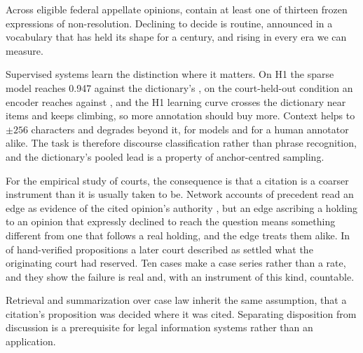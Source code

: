 Across \NEligible{} eligible federal appellate opinions, \Prevalence{} contain at least one
of thirteen frozen expressions of non-resolution. Declining to decide is routine,
announced in a vocabulary that has held its shape for a century, and rising in
every era we can measure.

Supervised systems learn the distinction where it matters. On H1 the sparse model
reaches 0.947 against the dictionary's \LexHOne{}, on the court-held-out condition an
encoder reaches \EncCourt{} against \LexCourt{}, and the H1 learning curve crosses the
dictionary near \LCCross{} items and keeps climbing, so more annotation should buy more.
Context helps to $\pm256$ characters and degrades beyond it, for models and for a human annotator alike. The task is
therefore discourse classification rather than phrase recognition, and the
dictionary's pooled lead is a property of anchor-centred sampling.

For the empirical study of courts, the consequence is that a citation is a
coarser instrument than it is usually taken to be. Network accounts of precedent
read an edge as evidence of the cited opinion's authority
\citep{fowler2007network, black2013citation}, but an edge ascribing a holding to
an opinion that expressly declined to reach the question means something
different from one that follows a real holding, and the edge treats them alike.
In \NIMEsc{} of \NIMDistinct{} hand-verified propositions a later court described as settled what the
originating court had reserved. Ten cases make a case series rather than a rate,
and they show the failure is real and, with an instrument of this kind, countable.

Retrieval and summarization over case law inherit the same assumption, that a
citation's proposition was decided where it was cited. Separating disposition
from discussion is a prerequisite for legal information systems rather than an
application.
